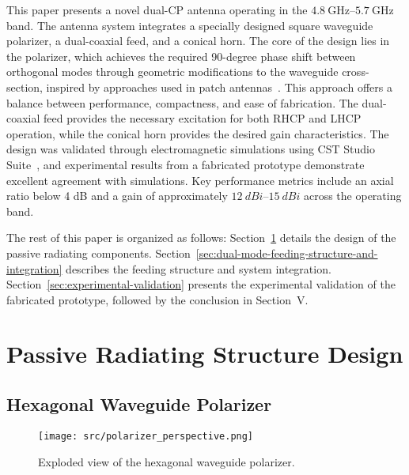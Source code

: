 \documentclass[journal,9pt]{IEEEtran}
\newcommand{\frequencyrange}{\qtyrange{4.8}{5.7}{\giga\hertz}}
\begin{document}
This paper presents a novel dual-CP antenna operating in the $\frequencyrange$ band. The antenna system integrates a specially designed square waveguide polarizer, a dual-coaxial feed, and a conical horn. The core of the design lies in the polarizer, which achieves the required 90-degree phase shift between orthogonal modes through geometric modifications to the waveguide cross-section, inspired by approaches used in patch antennas~\cite{armin-et-al:modification-of-a-2g2hz-sband-rectangular-patch-microstrip-antenna-using-truncated-corner-method-for-satellite-applications}. This approach offers a balance between performance, compactness, and ease of fabrication. The dual-coaxial feed provides the necessary excitation for both RHCP and LHCP operation, while the conical horn provides the desired gain characteristics. The design was validated through electromagnetic simulations using CST Studio Suite~\cite{cst}, and experimental results from a fabricated prototype demonstrate excellent agreement with simulations. Key performance metrics include an axial ratio below 4 dB and a gain of approximately $\qtyrange{12}{15}{dBi}$ across the operating band.

The rest of this paper is organized as follows: Section~\ref{sec:passive-radiating-structure-design} details the design of the passive radiating components. Section~\ref{sec:dual-mode-feeding-structure-and-integration} describes the feeding structure and system integration. Section~\ref{sec:experimental-validation} presents the experimental validation of the fabricated prototype, followed by the conclusion in Section~V.


\section{Passive Radiating Structure Design}
\label{sec:passive-radiating-structure-design}

\subsection{Hexagonal Waveguide Polarizer}
\label{subsec:hexagonal-waveguide-polarizer}

\begin{figure}[b]
    \centering
    \texttt{[image: src/polarizer\_perspective.png]}
    \caption{\label{fig:polarizer-perspective}Exploded view of the hexagonal waveguide polarizer.}
\end{figure}
\end{document}
